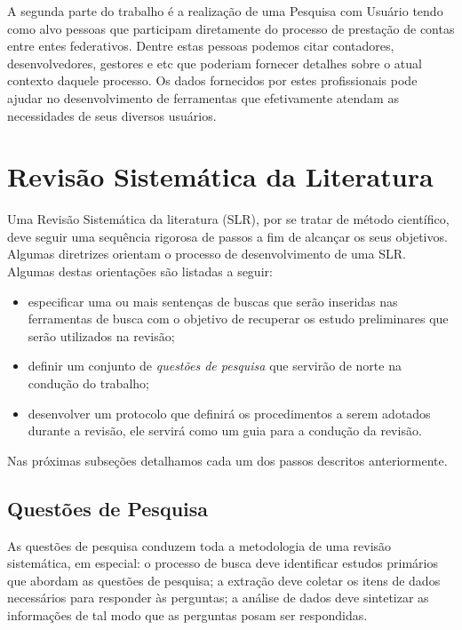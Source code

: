 \documentclass{article}
\begin{document}
A segunda parte do trabalho é a realização de uma Pesquisa com Usuário
tendo como alvo pessoas que participam diretamente do processo de prestação de contas
entre entes federativos. Dentre estas pessoas podemos citar
contadores, desenvolvedores, gestores e etc que poderiam fornecer
detalhes sobre o atual contexto daquele processo. Os dados fornecidos
por estes profissionais pode ajudar no desenvolvimento de
ferramentas que efetivamente atendam as necessidades de seus diversos usuários.

\section{Revisão Sistemática da Literatura}
\label{sec:rsl}

Uma Revisão Sistemática da literatura (SLR), por se tratar de método
científico, deve seguir uma sequência rigorosa de passos a fim de
alcançar os seus objetivos. Algumas diretrizes orientam o processo de desenvolvimento de uma
SLR\cite{keele2007guidelines}. Algumas destas orientações são listadas
a seguir:
\begin{itemize}
  \item especificar uma ou mais sentenças de buscas que serão
    inseridas nas ferramentas de busca com o objetivo de recuperar os
    estudo preliminares que serão utilizados na revisão;
  \item definir um conjunto de \textit{questões de pesquisa} que
    servirão de norte na condução do trabalho;
 \item  desenvolver um protocolo que definirá os procedimentos a serem adotados durante a revisão, ele servirá como um guia para a condução da revisão.
\end{itemize}

Nas próximas subseções detalhamos cada um dos passos descritos anteriormente.

\subsection{Questões de Pesquisa}
\label{subsec:research_question}

As questões de pesquisa conduzem toda a metodologia
de uma revisão sistemática, em especial: o processo de busca deve identificar estudos
primários que abordam as questões de pesquisa; a extração
deve coletar os itens de dados necessários para responder às
perguntas; a análise de dados deve sintetizar as
informações de tal modo que as perguntas posam ser respondidas.
\end{document}
